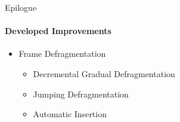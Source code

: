        \begin{frame}[t]{Epilogue}\framesubtitle{Developed Improvements}
                    \begin{itemize}
                        \item<1-4> Frame Defragmentation
                            \begin{itemize}
                                \item<1,2> Decremental Gradual Defragmentation
                                \item<1,3> Jumping Defragmentation
                                \item<1,4> Automatic Insertion
                            \end{itemize}
                    \end{itemize}
        \end{frame}

